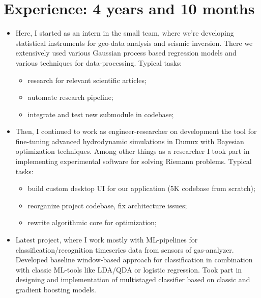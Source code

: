 \documentclass[12pt,a4paper,roman]{moderncv}
\begin{document}
\section{Experience: 4 years and 10 months}
\begin{itemize}
\item Here, I started as an intern in the small team, where we're developing statistical instruments for geo-data analysis and seismic inversion. 
There we extensively used various Gaussian process based regression models and various techniques for data-processing. \newline \newline
Typical tasks: 
 \begin{itemize}
  \item research for relevant scientific articles;
  \item automate research pipeline;
  \item integrate and test new submodule in codebase; \newline
 \end{itemize}
\item Then, I continued to work as engineer-researcher on development the tool for fine-tuning advanced 
hydrodynamic simulations in Dumux with Bayesian optimization techniques.  
Among other things as a researcher I took part in implementing experimental software for solving Riemann problems. \newline \newline
Typical tasks: 
 \begin{itemize}
  \item build custom desktop UI for our application (5K codebase from scratch);
  \item reorganize project codebase, fix architecture issues;
  \item rewrite algorithmic core for optimization; \newline
 \end{itemize}
\item Latest project, where I work mostly with ML-pipelines for classification/recognition timeseries data from sensors of gas-analyzer.
Developed baseline window-based approach for classification in combination with classic ML-tools like LDA/QDA or logistic regression. 
Took part in designing and implementation of multistaged classifier based on classic and gradient boosting models.
\newline \newline

\end{itemize}
\end{document}
